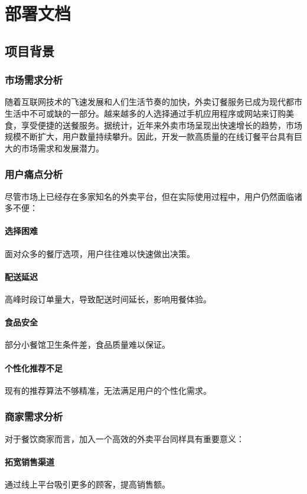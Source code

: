 
\chapter{部署文档}

\section{项目背景}

\subsection{市场需求分析}
随着互联网技术的飞速发展和人们生活节奏的加快，外卖订餐服务已成为现代都市生活中不可或缺的一部分。越来越多的人选择通过手机应用程序或网站来订购美食，享受便捷的送餐服务。据统计，近年来外卖市场呈现出快速增长的趋势，市场规模不断扩大，用户数量持续攀升。因此，开发一款高质量的在线订餐平台具有巨大的市场需求和发展潜力。

\subsection{用户痛点分析}
尽管市场上已经存在多家知名的外卖平台，但在实际使用过程中，用户仍然面临诸多不便：
\subsubsection{选择困难}
面对众多的餐厅选项，用户往往难以快速做出决策。
\subsubsection{配送延迟}
高峰时段订单量大，导致配送时间延长，影响用餐体验。
\subsubsection{食品安全}
部分小餐馆卫生条件差，食品质量难以保证。
\subsubsection{个性化推荐不足}
现有的推荐算法不够精准，无法满足用户的个性化需求。

\subsection{商家需求分析}
对于餐饮商家而言，加入一个高效的外卖平台同样具有重要意义：
\subsubsection{拓宽销售渠道}
通过线上平台吸引更多的顾客，提高销售额。
